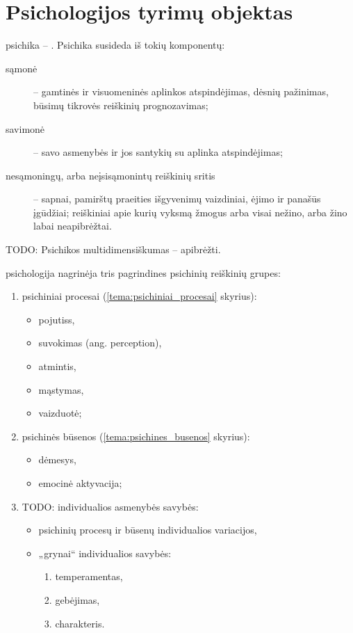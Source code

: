 \section{Psichologijos tyrimų objektas}

\label{tema:psichikos_samprata}

\Gls{psichika} – . Psichika susideda iš tokių 
komponentų:
\begin{description}
  \item[sąmonė] – gamtinės ir visuomeninės aplinkos atspindėjimas, dėsnių
    pažinimas, būsimų tikrovės reiškinių prognozavimas;
  \item[savimonė] – savo asmenybės ir jos santykių su aplinka atspindėjimas;
  \item[nesąmoningų, arba neįsisąmonintų reiškinių sritis] – sapnai, 
    pamirštų praeities išgyvenimų vaizdiniai, ėjimo ir panašūs įgūdžiai;
    reiškiniai apie kurių vyksmą žmogus arba visai nežino, arba žino
    labai neapibrėžtai.
\end{description}

TODO: Psichikos multidimensiškumas – apibrėžti.

\Gls{psichologija} nagrinėja tris pagrindines psichinių reiškinių grupes:
\begin{enumerate}
  \item psichiniai procesai (\ref{tema:psichiniai_procesai} skyrius):
    \begin{itemize}
      \item \glspl{pojutis},
      \item suvokimas (ang. perception),
      \item atmintis,
      \item mąstymas,
      \item vaizduotė;
    \end{itemize}
  \item psichinės būsenos (\ref{tema:psichines_busenos} skyrius):
    \begin{itemize}
      \item dėmesys,
      \item emocinė aktyvacija;
    \end{itemize}
  \item TODO: individualios asmenybės savybės:
    \begin{itemize}
      \item psichinių procesų ir būsenų individualios variacijos,
      \item „grynai“ individualios savybės:
        \begin{enumerate}
          \item temperamentas,
          \item gebėjimas,
          \item charakteris.
        \end{enumerate}
    \end{itemize}
\end{enumerate}

